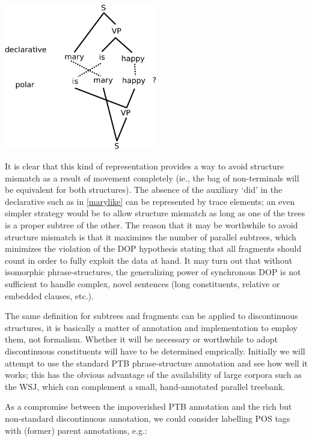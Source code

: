 \documentclass[a4paper]{article}
\theoremstyle{definition}
\begin{document}
\begin{center}
\includegraphics[width=0.5\textwidth]{maryishappy-crop.pdf}
\end{center}
\vspace{1em}

It is clear that this kind of representation provides a way to avoid structure
mismatch as a result of movement completely (ie., the bag of non-terminals will
be equivalent for both structures). The absence of the auxiliary `did' in the
declarative such as in \ref{marylike} can be represented by trace elements; an
even simpler strategy would be to allow structure mismatch as long as one of
the trees is a proper subtree of the other. The reason that it may be
worthwhile to avoid structure mismatch is that it maximizes the number of
parallel subtrees, which minimizes the violation of the DOP hypothesis stating
that all fragments should count in order to fully exploit the data at hand. It
may turn out that without isomorphic phrase-structures, the generalizing power
of synchronous DOP is not sufficient to handle complex, novel sentences (long
constituents, relative or embedded clauses, etc.).

The same definition for subtrees and fragments can be applied to discontinuous
structures, it is basically a matter of annotation and implementation to employ
them, not formalism.  Whether it will be necessary or worthwhile to adopt
discontinuous constituents will have to be determined emprically. Initially we
will attempt to use the standard PTB phrase-structure annotation and see how well
it works; this has the obvious advantage of the availability of large corpora such
as the WSJ, which can complement a small, hand-annotated parallel treebank.

\newpage %

As a compromise between the impoverished PTB annotation and the rich but non-standard
discontinuous annotation, we could consider labelling POS tags with (former) parent
annotations, e.g.:
\end{document}
